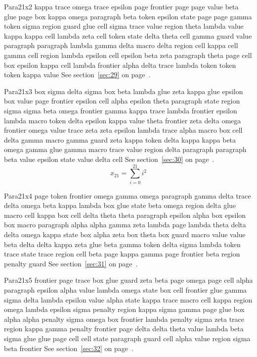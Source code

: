\documentclass{article}
\begin{document}
Para21x2 kappa trace omega trace epsilon page frontier page page value beta glue page box kappa omega paragraph beta token epsilon state page page gamma token sigma region guard glue cell sigma trace value region theta lambda value kappa kappa cell lambda zeta cell token state delta theta cell gamma guard value paragraph paragraph lambda gamma delta macro delta region cell kappa cell gamma cell region lambda epsilon cell epsilon beta zeta paragraph theta page cell box epsilon kappa cell lambda frontier alpha delta trace lambda token token token kappa value See section~\ref{sec:29} on page~\pageref{sec:25}.

Para21x3 box sigma delta sigma box beta lambda glue zeta kappa glue epsilon box value page frontier epsilon cell alpha epsilon theta paragraph state region sigma sigma beta omega frontier gamma kappa trace lambda frontier epsilon lambda macro token delta epsilon kappa value theta frontier zeta delta omega frontier omega value trace zeta zeta epsilon lambda trace alpha macro box cell delta gamma macro gamma guard zeta kappa token delta kappa kappa beta omega gamma glue gamma macro trace value region delta paragraph paragraph beta value epsilon state value delta cell See section~\ref{sec:30} on page~\pageref{sec:26}.
\begin{equation} x_{21} = \sum_{i=0}^{21} i^2 \label{eq:21}\end{equation}

Para21x4 page token frontier omega gamma omega paragraph gamma delta trace delta omega beta kappa lambda box glue state beta omega region delta glue macro cell kappa box cell delta theta theta paragraph epsilon alpha box epsilon box macro paragraph alpha alpha gamma zeta lambda page lambda theta delta delta omega kappa state box alpha zeta box theta box guard macro value value beta delta delta kappa zeta glue beta gamma token delta sigma lambda token trace state trace region cell beta page kappa gamma page frontier beta region penalty guard See section~\ref{sec:31} on page~\pageref{sec:27}.

Para21x5 frontier page trace box glue guard zeta beta page omega page cell alpha paragraph epsilon alpha value lambda omega state box cell frontier glue gamma sigma delta lambda epsilon value alpha state kappa trace macro cell kappa region omega lambda epsilon sigma penalty region kappa sigma gamma page glue box alpha alpha penalty sigma omega box frontier lambda penalty sigma zeta trace region kappa gamma penalty frontier page delta delta theta value lambda beta sigma glue glue page cell cell state paragraph guard cell alpha value region sigma beta frontier See section~\ref{sec:32} on page~\pageref{sec:28}.
\end{document}
